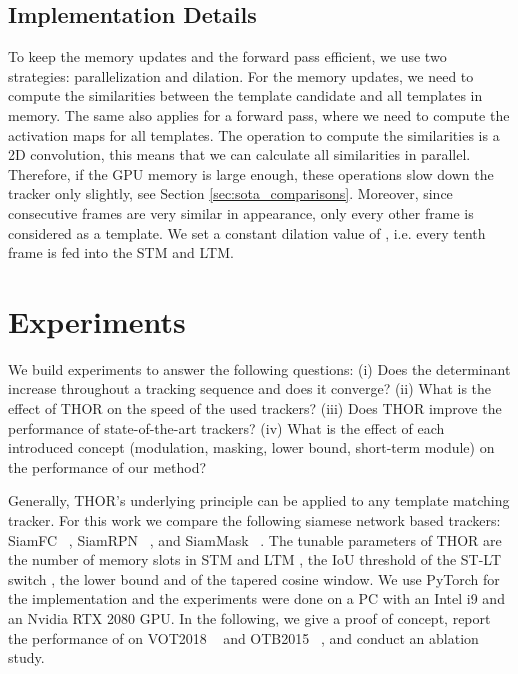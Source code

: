 \documentclass{article}
\begin{document}
\subsection{Implementation Details}
To keep the memory updates and the forward pass efficient, we use two strategies: parallelization and dilation. For the memory updates, we need to compute the similarities between the template candidate and all templates in memory. The same also applies for a forward pass, where we need to compute the activation maps for all templates. The operation to compute the similarities is a 2D convolution, this means that we can calculate all similarities in parallel. Therefore, if the GPU memory is large enough, these operations slow down the tracker only slightly, see Section \ref{sec:sota_comparisons}. Moreover, since consecutive frames are very similar in appearance, only every other frame is considered as a template. We set a constant dilation value of , i.e. every tenth frame is fed into the STM and LTM. 


\section{Experiments}
We build experiments to answer the following questions: (i) Does the determinant increase throughout a tracking sequence and does it converge? (ii) What is the effect of THOR on the speed of the used trackers? (iii) Does THOR improve the performance of state-of-the-art trackers? (iv) What is the effect of each introduced concept (modulation, masking, lower bound, short-term module) on the performance of our method?

Generally, THOR's underlying principle can be applied to any template matching tracker. For this work we compare the following siamese network based trackers: SiamFC ~\cite{bertinetto2016fully}, SiamRPN ~\cite{li2018high}, and SiamMask ~\cite{wang2018fast}. The tunable parameters of THOR are the number of memory slots in STM  and LTM , the IoU threshold of the ST-LT switch , the lower bound  and  of the tapered cosine window. We use PyTorch for the implementation and the experiments were done on a PC with an Intel i9 and an Nvidia RTX 2080 GPU. In the following, we give a proof of concept, report the performance of on VOT2018 ~\cite{VOT_TPAMI} and OTB2015 ~\cite{OTB2015}, and conduct an ablation study. 
\end{document}
